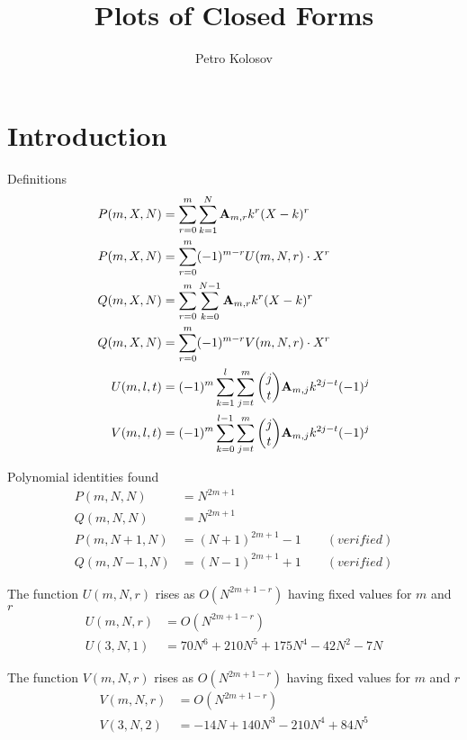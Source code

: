 \documentclass[12pt,letterpaper,oneside,reqno]{amsart}
\title[Plots of Closed Forms]
{Plots of Closed Forms}
\author[Petro Kolosov]{Petro Kolosov}
\newcommand \coeffA [3][A] {{\mathbf{#1}} \sb{#2,#3}}
\newcommand \polynomialP [4][P]{{#1}(#2,#3,#4)}
\newcommand \polynomialQ [4][Q]{{#1}(#2,#3,#4)}
\begin{document}
    \maketitle

    \tableofcontents


    \section{Introduction}\label{sec:introduction}
    Definitions
    \begin{align*}
        \polynomialP{m}{X}{N} &= \sum_{r=0}^{m} \sum_{k=1}^{N} \coeffA{m}{r} k^r (X-k)^r \\
        \polynomialP{m}{X}{N} &= \sum_{r=0}^{m} (-1)^{m-r} U(m, N, r) \cdot X^{r} \\
        \polynomialQ{m}{X}{N} &= \sum_{r=0}^{m} \sum_{k=0}^{N-1} \coeffA{m}{r} k^r (X-k)^r \\
        \polynomialQ{m}{X}{N} &= \sum_{r=0}^{m} (-1)^{m-r} V(m, N, r) \cdot X^{r} \\
        U(m, l, t) &= (-1)^m \sum_{k=1}^{l} \sum_{j=t}^{m} \binom{j}{t} \coeffA{m}{j} k^{2j-t} (-1)^j \\
        V(m, l, t) &= (-1)^m \sum_{k=0}^{l-1}  \sum_{j=t}^{m} \binom{j}{t} \coeffA{m}{j} k^{2j-t} (-1)^j
    \end{align*}

    Polynomial identities found
    \begin{align*}
        \polynomialP{m}{N}{N} &= N^{2m+1} \\
        \polynomialQ{m}{N}{N} &= N^{2m+1} \\
        \polynomialP{m}{N+1}{N} &= (N+1)^{2m+1} - 1 \quad \quad (verified) \\
        \polynomialQ{m}{N-1}{N} &= (N-1)^{2m+1} + 1 \quad \quad (verified)
    \end{align*}

    The function $U(m, N, r)$ rises as $O(N^{2m+1-r})$ having fixed values for $m$ and $r$
    \begin{align*}
        U(m, N, r) &= O(N^{2m+1-r}) \\
        U(3, N, 1) &= 70 N^6+210 N^5+175 N^4-42 N^2-7 N
    \end{align*}

    The function $V(m, N, r)$ rises as $O(N^{2m+1-r})$ having fixed values for $m$ and $r$
    \begin{align*}
        V(m, N, r) &= O(N^{2m+1-r}) \\
        V(3, N, 2) &= -14 N + 140 N^3 - 210 N^4 + 84 N^5
    \end{align*}
\end{document}
